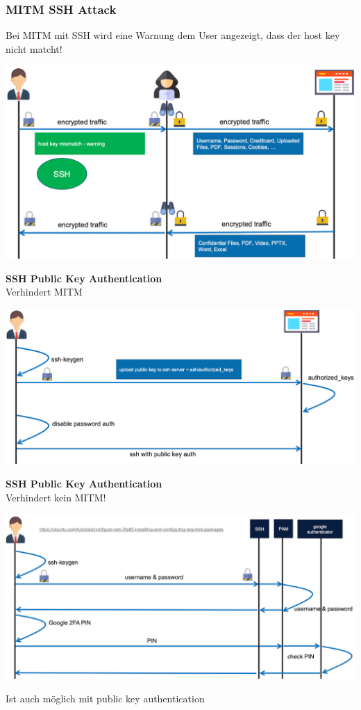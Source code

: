 \subsubsection{MITM SSH Attack}
Bei MITM mit SSH wird eine Warnung dem User angezeigt, dass der host key nicht matcht!
\begin{center}
    \vspace{-8pt}
    \includegraphics[width=.8\linewidth]{./img/09-mitm/ssh_overview}
    \vspace{-8pt}
\end{center}

\textbf{SSH Public Key Authentication}\\
Verhindert MITM
\begin{center}
    \vspace{-8pt}
    \includegraphics[width=.8\linewidth]{./img/09-mitm/pk_auth}
    \vspace{-8pt}
\end{center}

\columnbreak

\textbf{SSH Public Key Authentication}\\
Verhindert kein MITM!
\begin{center}
    \vspace{-8pt}
    \includegraphics[width=.8\linewidth]{./img/09-mitm/ssh_2fa}
    \vspace{-8pt}
\end{center}
Ist auch möglich mit public key authentication

